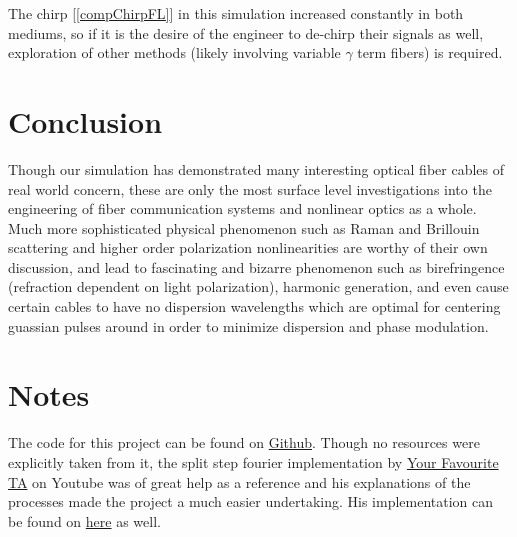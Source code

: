 \documentclass[10pt, a4paper, twocolumn]{article} %
\begin{document}
The chirp [\ref{compChirpFL}] in this simulation increased constantly in both mediums, so if it is the desire of the engineer to de-chirp their signals as well, exploration of other methods (likely involving variable $\gamma$ term fibers) is required.

\section{Conclusion}
Though our simulation has demonstrated many interesting optical fiber cables of real world concern, these are only the most surface level investigations into the engineering of fiber communication systems and nonlinear optics as a whole. Much more sophisticated physical phenomenon such as Raman and Brillouin scattering and higher order polarization nonlinearities are worthy of their own discussion, and lead to fascinating and bizarre phenomenon such as birefringence (refraction dependent on light polarization), harmonic generation, and even cause certain cables to have no dispersion wavelengths which are optimal for centering guassian pulses around in order to minimize dispersion and phase modulation.

\section{Notes}
The code for this project can be found on \href{https://github.com/NConstantinides/PHYS273HProject}{Github}. Though no resources were explicitly taken from it, the split step fourier implementation by \href{https://www.youtube.com/@yourfavouriteta9282}{Your Favourite TA} on Youtube was of great help as a reference and his explanations of the processes made the project a much easier undertaking. His implementation can be found on \href{https://github.com/OleKrarup123/NLSE-vector-solver}{here} as well.


\printbibliography[title={Bibliography}] %

\end{document}
